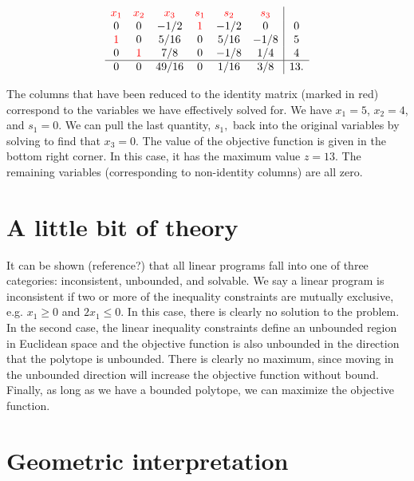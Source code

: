 \documentclass[12pt,english]{article}
\begin{document}
\begin{equation}
\begin{array}{cccccc|c}
\textcolor{red}{x_1}   &     \textcolor{red}{x_2} 	& \textcolor{red}{x_3} & \textcolor{red}{s_1}  & \textcolor{red}{s_2} & \textcolor{red}{s_3}   & 	\\
0 				&	0				&	-1/2	&	\textcolor{red}{1}	&	-1/2	&	0 	&	0 \\
\textcolor{red}{1}	&	0				&	5/16	&	0				&	5/16	&	-1/8	&	5 \\
0				&	\textcolor{red}{1}	&	7/8	&	0				&	-1/8	&	1/4	&	4 \\
\hline
0				&	0				&   49/16  &	0				&	1/16	&	3/8	&	13.
\end{array}
\end{equation}

The columns that have been reduced to the identity matrix (marked in red) correspond to the variables we have effectively solved for.  We have $x_1 = 5$, $x_2 = 4$, and $s_1 = 0$.  We can pull the last quantity, $s_1,$ back into the original variables by solving to find that $x_3 = 0$.  The value of the objective function is given in the bottom right corner.  In this case, it has the maximum value $z = 13$.  The remaining variables (corresponding to non-identity columns) are all zero.

\section{A little bit of theory}

It can be shown (reference?) that all linear programs fall into one of three categories: inconsistent, unbounded, and solvable.  We say a linear program is inconsistent if two or more of the inequality constraints are mutually exclusive, e.g. $x_1 \geq 0$ and $2 x_1 \leq 0$.  In this case, there is clearly no solution to the problem.   In the second case, the linear inequality constraints define an unbounded region in Euclidean space and the objective function is also unbounded in the direction that the polytope is unbounded.  There is clearly no maximum, since moving in the unbounded direction will increase the objective function without bound.  Finally, as long as we have a bounded polytope, we can maximize the objective function. \\

\section{Geometric interpretation}
\end{document}
